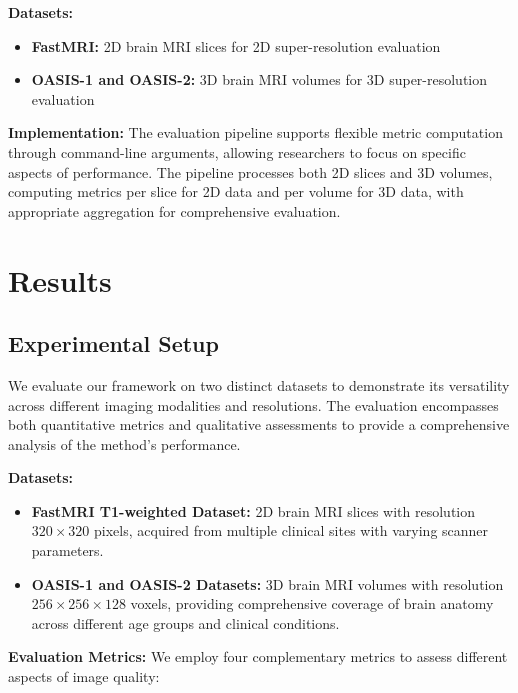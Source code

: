 \documentclass{midl} %
\begin{document}
\textbf{Datasets:}
\begin{itemize}
\item \textbf{FastMRI:} 2D brain MRI slices for 2D super-resolution evaluation
\item \textbf{OASIS-1 and OASIS-2:} 3D brain MRI volumes for 3D super-resolution evaluation
\end{itemize}

\textbf{Implementation:} The evaluation pipeline supports flexible metric computation through command-line arguments, allowing researchers to focus on specific aspects of performance. The pipeline processes both 2D slices and 3D volumes, computing metrics per slice for 2D data and per volume for 3D data, with appropriate aggregation for comprehensive evaluation.

\section{Results}

\subsection{Experimental Setup}

We evaluate our framework on two distinct datasets to demonstrate its versatility across different imaging modalities and resolutions. The evaluation encompasses both quantitative metrics and qualitative assessments to provide a comprehensive analysis of the method's performance.

\textbf{Datasets:}
\begin{itemize}
\item \textbf{FastMRI T1-weighted Dataset:} 2D brain MRI slices with resolution $320 \times 320$ pixels, acquired from multiple clinical sites with varying scanner parameters.
\item \textbf{OASIS-1 and OASIS-2 Datasets:} 3D brain MRI volumes with resolution $256 \times 256 \times 128$ voxels, providing comprehensive coverage of brain anatomy across different age groups and clinical conditions.
\end{itemize}

\textbf{Evaluation Metrics:} We employ four complementary metrics to assess different aspects of image quality:
\end{document}
